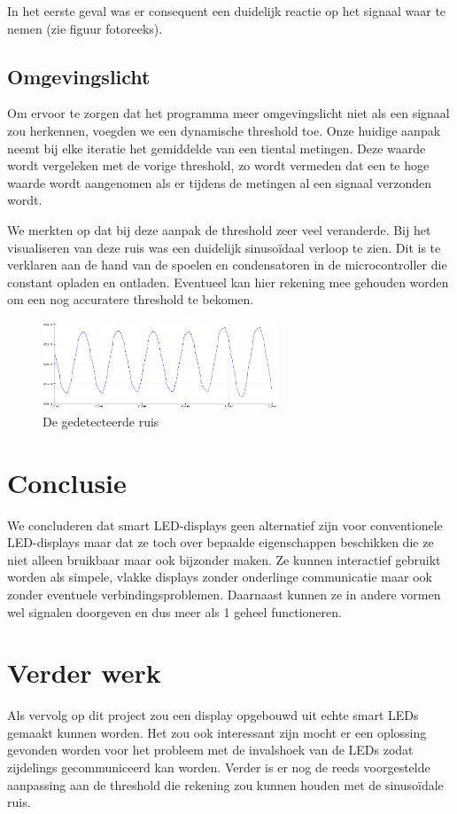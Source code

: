 \documentclass{article}
\begin{document}
In het eerste geval was er consequent een duidelijk reactie op het signaal waar te nemen (zie figuur fotoreeks). 

\subsection{Omgevingslicht}
Om ervoor te zorgen dat het programma meer omgevingslicht niet als een signaal zou herkennen, voegden we een dynamische threshold toe.
Onze huidige aanpak neemt bij elke iteratie het gemiddelde van een tiental metingen. Deze waarde wordt vergeleken met de vorige threshold, zo wordt vermeden dat een te hoge waarde wordt aangenomen als er tijdens de metingen al een signaal verzonden wordt.

We merkten op dat bij deze aanpak de threshold zeer veel veranderde. Bij het visualiseren van deze ruis was een duidelijk sinusoïdaal verloop te zien. Dit is te verklaren aan de hand van de spoelen en condensatoren in de microcontroller die constant opladen en ontladen. Eventueel kan hier rekening mee gehouden worden om een nog accuratere threshold te bekomen.
\begin{figure}
\centering
\includegraphics[width=7cm]{ruis.png}
\caption{De gedetecteerde ruis}
\end{figure}



\section{Conclusie}
We concluderen dat smart LED-displays geen alternatief zijn voor conventionele LED-displays maar dat ze toch over bepaalde eigenschappen beschikken die ze niet alleen bruikbaar maar ook bijzonder maken. Ze kunnen interactief gebruikt worden als simpele, vlakke displays zonder onderlinge communicatie maar ook zonder eventuele verbindingsproblemen. Daarnaast kunnen ze in andere vormen wel signalen doorgeven en dus meer als 1 geheel functioneren.


\section{Verder werk}
Als vervolg op dit project zou een display opgebouwd uit echte smart LEDs gemaakt kunnen worden. Het zou ook interessant zijn mocht er een oplossing gevonden worden voor het probleem met de invalshoek van de LEDs zodat zijdelings gecommuniceerd kan worden. Verder is er nog de reeds voorgestelde aanpassing aan de threshold die rekening zou kunnen houden met de sinusoïdale ruis.




\end{document}
